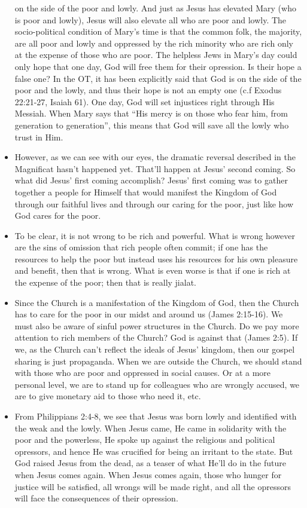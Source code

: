 \begin{itemize}
{  on the side of the poor and lowly.  And just as Jesus has elevated Mary
  (who is poor and lowly), Jesus will also elevate all who are poor and
  lowly.  The socio-political condition of Mary's time is that the common
  folk, the majority, are all poor and lowly and oppressed by the rich
  minority who are rich only at the expense of those who are poor.  The
  helpless Jews in Mary's day could only hope that one day, God will free
  them for their opression.  Is their hope a false one?  In the OT, it has
  been explicitly said that God is on the side of the poor and the lowly, and
  thus their hope is not an empty one (c.f Exodus 22:21-27, Isaiah 61).  One
  day, God will set injustices right through His Messiah.  When Mary says
  that ``His mercy is on those who fear him, from generation to generation'',
  this means that God will save all the lowly who trust in Him.}
  \item{However, as we can see with our eyes, the dramatic reversal described
  in the Magnificat hasn't happened yet.  That'll happen at Jesus' second
  coming.  So what did Jesus' first coming accomplish?  Jesus' first coming
  was to gather together a people for Himself that would manifest the Kingdom
  of God through our faithful lives and through our caring for the poor, just
  like how God cares for the poor.  }
  \item{To be clear, it is not wrong to be rich and powerful.  What is wrong
  however are the sins of omission that rich people often commit; if one has
  the resources to help the poor but instead uses his resources for his own
  pleasure and benefit, then that is wrong.  What is even worse is that if
  one is rich at the expense of the poor; then that is really jialat.}
  \item{Since the Church is a manifestation of the Kingdom of God, then the
  Church has to care for the poor in our midst and around us (James 2:15-16).
  We must also be aware of sinful power structures in the Church.  Do we pay
  more attention to rich members of the Church?  God is against that (James
  2:5).  If we, as the Church can't reflect the ideals of Jesus' kingdom,
  then our gospel sharing is just propaganda.  When we are outside the
  Church, we should stand with those who are poor and oppressed in social
  causes.  Or at a more personal level, we are to stand up for colleagues who
  are wrongly accused, we are to give monetary aid to those who need it,
  etc.}
  \item{From Philippians 2:4-8, we see that Jesus was born lowly and
  identified with the weak and the lowly.  When Jesus came, He came in
  solidarity with the poor and the powerless, He spoke up against the
  religious and political opressors, and hence He was crucified for being an
  irritant to the state.  But God raised Jesus from the dead, as a teaser of
  what He'll do in the future when Jesus comes again.  When Jesus comes
  again, those who hunger for justice will be satisfied, all wrongs will be
  made right, and all the opressors will face the consequences of their
  opression.}
\end{itemize}
